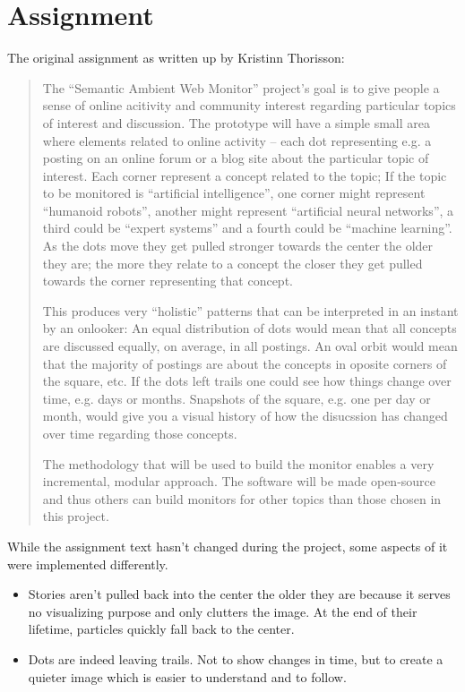 \chapter{\label{cpt:assignment}Assignment}

The original assignment as written up by Kristinn Thorisson:

\begin{quote}

  The ``Semantic Ambient Web Monitor'' project's goal is to give people a sense
  of online acitivity and community interest regarding particular topics of
  interest and discussion. The prototype will have a simple small area where
  elements related to online activity -- each dot representing e.g. a posting
  on an online forum or a blog site about the particular topic of interest.
  Each corner represent a concept related to the topic; If the topic to be
  monitored is ``artificial intelligence'', one corner might represent
  ``humanoid robots'', another might represent ``artificial neural networks'',
  a third could be ``expert systems'' and a fourth could be ``machine
  learning''. As the dots move they get pulled stronger towards the center the
  older they are; the more they relate to a concept the closer they get pulled
  towards the corner representing that concept.

  This produces very ``holistic'' patterns that can be interpreted in an
  instant by an onlooker: An equal distribution of dots would mean that all
  concepts are discussed equally, on average, in all postings. An oval orbit
  would mean that the majority of postings are about the concepts in oposite
  corners of the square, etc. If the dots left trails one could see how things
  change over time, e.g. days or months. Snapshots of the square, e.g. one per
  day or month, would give you a visual history of how the disucssion has
  changed over time regarding those concepts.

  The methodology that will be used to build the monitor enables a very
  incremental, modular approach. The software will be made open-source and thus
  others can build monitors for other topics than those chosen in this project.

\end{quote}

While the assignment text hasn't changed during the project, some aspects of it
were implemented differently.

\begin{itemize}

 \item Stories aren't pulled back into the center the older they are because it
       serves no visualizing purpose and only clutters the image. At the end of
       their lifetime, particles quickly fall back to the center.

 \item Dots are indeed leaving trails. Not to show changes in time, but to
       create a quieter image which is easier to understand and to follow.

\end{itemize}

